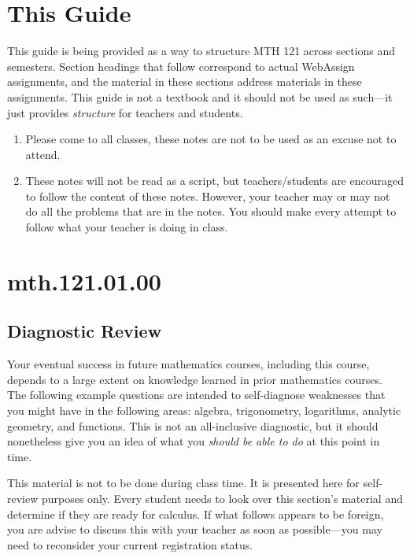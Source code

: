 \documentclass[12pt,addpoints, answers, fleqn]{exam}
\begin{document}
\vfill
\pagebreak

\section{This Guide}
This guide is being provided as a way to structure MTH 121 across sections and semesters. Section headings that follow correspond to actual WebAssign assignments, and the material in these sections address materials in these assignments.  This guide is not a textbook and it should not be used as such---it just provides \emph{structure} for  teachers and students.

\begin{enumerate}
\item Please come to all classes, these notes are not to be used as an excuse not to attend.
\item These notes will not be read as a script, but teachers/students are encouraged to follow the content of these notes. However, your teacher may or may not do all the problems that are in the notes. You should  make every attempt to follow what your teacher is doing in class.
\end{enumerate}



\vfill
\pagebreak



\section{mth.121.01.00}
\subsection{Diagnostic Review}
Your eventual success in future mathematics courses, including this course, depends to a large extent on knowledge learned in prior mathematics courses. The following example questions are intended to self-diagnose weaknesses that you might have in the following areas: algebra, trigonometry, logarithms, analytic geometry, and functions. This is not an all-inclusive diagnostic, but it should nonetheless give you an idea of what you \emph{should be able to do} at this point in time.

This material is not to be done during class time. It is presented here for self-review purposes only. Every student needs to look over this section's material and determine if they are ready for calculus. If what follows appears to be foreign, you are advise to discuss this with your teacher as soon as possible---you may need to reconsider your current registration status.
\end{document}
